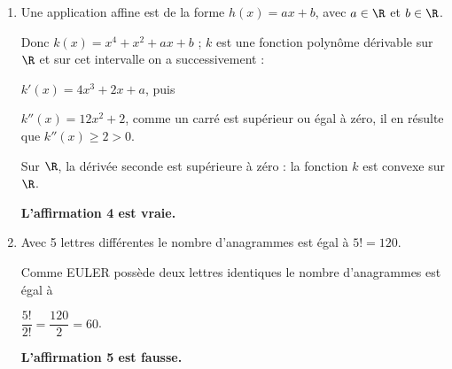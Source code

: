 \begin{enumerate}
\textit{Conclusion} : La relation est vraie au rang 0 et si elle est vraie au rang $n \in \N$, elle l'est aussi au rang $n + 1$ : d'après le principe de récurrence quel que soit $\begin{gathered}n \in \N, \\\: u_{n+1} < u_n\end{gathered}$ : ceci montre que la suite $(u_n)$ est décroissante.

\hfill\textbf{L'affirmation 3 est vraie.}

\item Une application affine est de la forme $h(x) = ax + b$, avec $a \in \R$ et $b \in \R$.

Donc $k(x) = x^4 + x^2 + ax + b$ ; $k$ est une fonction polynôme dérivable sur $\R$ et sur cet intervalle on a successivement :

$k'(x) = 4x^3 + 2x + a$, puis

$k''(x) = 12x^2 + 2$, comme un carré est supérieur ou égal à zéro, il en résulte que $k''(x) \geqslant 2 > 0$.

Sur $\R$, la dérivée seconde est supérieure à zéro : la fonction $k$ est convexe sur $\R$.

\hfill\textbf{L'affirmation 4 est vraie.}

\item Avec 5 lettres différentes le nombre d'anagrammes est égal à $5! = 120$.

Comme EULER possède deux lettres identiques le nombre d'anagrammes est égal à 

$\dfrac{5!}{2!} = \dfrac{120}{2} = 60$.

\hfill\textbf{L'affirmation 5 est fausse.}
\end{enumerate}
